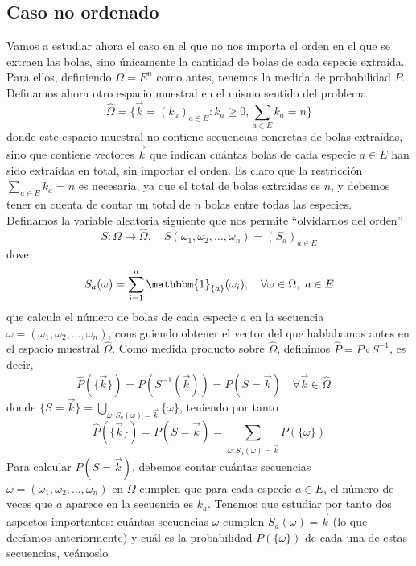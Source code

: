 \subsection{Caso no ordenado}
\noindent
Vamos a estudiar ahora el caso en el que no nos importa el orden en el que se extraen las bolas, sino únicamente la cantidad de bolas de cada especie extraída. Para ellos, definiendo $\Omega=E^n$ como antes, tenemos la medida de probabilidad $P$. \\
\noindent
Definamos ahora otro espacio muestral en el mismo sentido del problema
\begin{equation*}
    \hat{\Omega}= \{\vec{k}=(k_a)_{a\in E}: k_a\geq 0, \sum_{a\in E} k_a = n\}
\end{equation*}
donde este espacio muestral no contiene secuencias concretas de bolas extraídas, sino que contiene vectores $\vec{k}$ que indican cuántas bolas de cada especie $a\in E$ han sido extraídas en total, sin importar el orden. Es claro que la restricción $\sum\limits_{a\in E} k_a = n$ es necesaria, ya que el total de bolas extraídas es $n$, y debemos tener en cuenta de contar un total de $n$ bolas entre todas las especies. \\
\noindent
Definamos la variable aleatoria siguiente que nos permite ``olvidarnos del orden''
\begin{equation*}
    S:\Omega \to \hat{\Omega}, \quad S(\omega_1, \omega_2, \ldots, \omega_n) = (S_a)_{a\in E} 
\end{equation*}
dove 
\begin{equation*}
    S_a(\omega)=\sum_{i=1}^n \mathbbm{1}_{\{a\}}(\omega_i), \quad \forall \omega \in \Omega, \ a\in E
\end{equation*}
que calcula el número de bolas de cada especie $a$ en la secuencia $\omega=(\omega_1, \omega_2, \ldots, \omega_n)$, consiguiendo obtener el vector del que hablabamos antes en el espacio muestral $\hat{\Omega}$. Como medida producto sobre $\hat{\Omega}$, definimos $\hat{P} = P \circ S^{-1}$, es decir,
\begin{equation*}
    \hat{P}(\{\vec{k}\}) = P(S^{-1}(\vec{k}))=P(S=\vec{k}) \quad \forall \vec{k} \in \hat{\Omega} \quad 
\end{equation*}
donde $\{S=\vec{k}\} = \bigcup_{\omega: S_a(\omega)=\vec{k}}\{\omega\}$, teniendo por tanto 
\begin{equation*}
    \hat{P}(\{\vec{k}\}) = P(S=\vec{k}) = \sum_{\omega: S_a(\omega)=\vec{k}} P(\{\omega\}) 
\end{equation*}
Para calcular $P(S=\vec{k})$, debemos contar cuántas secuencias $\omega=(\omega_1, \omega_2, \ldots, \omega_n)$ en $\Omega$ cumplen que para cada especie $a\in E$, el número de veces que $a$ aparece en la secuencia es $k_a$. Tenemos que estudiar por tanto dos aspectos importantes: cuántas secuencias $\omega$ cumplen $S_a(\omega)=\vec{k}$ (lo que decíamos anteriormente) y cuál es la probabilidad $P(\{\omega\})$ de cada una de estas secuencias, veámoslo
